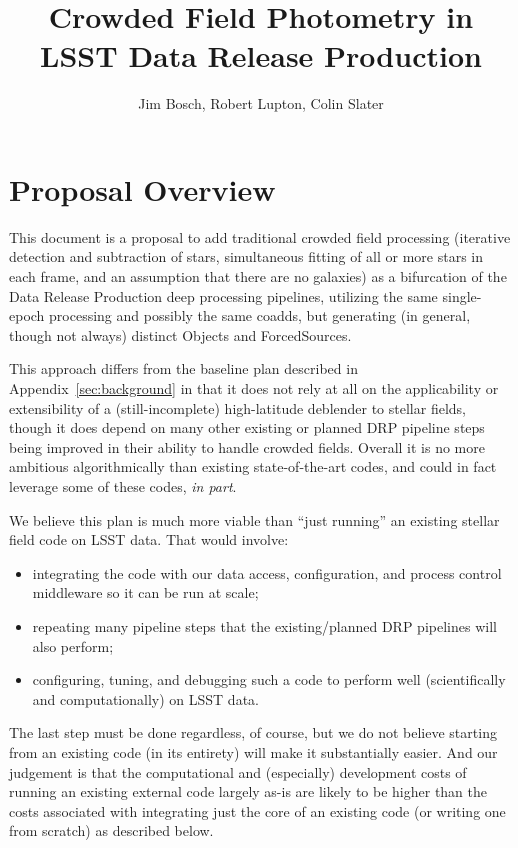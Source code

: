 \documentclass[DM,authoryear,toc]{lsstdoc}
\title{Crowded Field Photometry in LSST Data Release Production}
\author{%
Jim Bosch,
Robert Lupton,
Colin Slater
}
\date{\vcsDate}
\begin{document}
\maketitle

\section{Proposal Overview}

This document is a proposal to add traditional crowded field processing (iterative detection and subtraction of stars, simultaneous fitting of all or more stars in each frame, and an assumption that there are no galaxies) as a bifurcation of the Data Release Production deep processing pipelines, utilizing the same single-epoch processing and possibly the same coadds, but generating (in general, though not always) distinct Objects and ForcedSources.

This approach differs from the baseline plan described in Appendix~\ref{sec:background} in that it does not rely at all on the applicability or extensibility of a (still-incomplete) high-latitude deblender to stellar fields, though it does depend on many other existing or planned DRP pipeline steps being improved in their ability to handle crowded fields.
Overall it is no more ambitious algorithmically than existing state-of-the-art codes, and could in fact leverage some of these codes, \emph{in part}.

We believe this plan is much more viable than ``just running'' an existing stellar field code on LSST data.
That would involve:
\begin{itemize}
  \item integrating the code with our data access, configuration, and process control middleware so it can be run at scale;
  \item repeating many pipeline steps that the existing/planned DRP pipelines will also perform;
  \item configuring, tuning, and debugging such a code to perform well (scientifically and computationally) on LSST data.
\end{itemize}
The last step must be done regardless, of course, but we do not believe starting from an existing code (in its entirety) will make it substantially easier.
And our judgement is that the computational and (especially) development costs of running an existing external code largely as-is are likely to be higher than the costs associated with integrating just the core of an existing code (or writing one from scratch) as described below.
\end{document}
